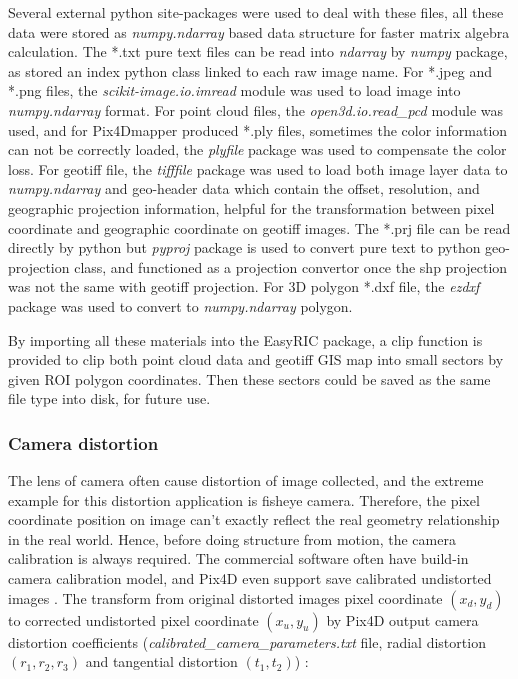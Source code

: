 \documentclass{configs/bmcart}
\begin{document}
Several external python site-packages were used to deal with these files, all these data were stored as \textit{numpy.ndarray} based data structure for faster matrix algebra calculation. The *.txt pure text files can be read into \textit{ndarray} by \textit{numpy} package, as stored an index python class linked to each raw image name. For *.jpeg and *.png files, the \textit{scikit-image.io.imread} module was used to load image into \textit{numpy.ndarray} format. For point cloud files, the \textit{open3d.io.read\_pcd} module was used, and for Pix4Dmapper produced *.ply files, sometimes the color information can not be correctly loaded, the \textit{plyfile} package was used to compensate the color loss. For geotiff file, the \textit{tifffile} package was used to load both image layer data to \textit{numpy.ndarray} and geo-header data which contain the offset, resolution, and geographic projection information, helpful for the transformation between pixel coordinate and geographic coordinate on geotiff images. The *.prj file can be read directly by python but \textit{pyproj} package is used to convert pure text to python geo-projection class, and functioned as a projection convertor once the shp projection was not the same with geotiff projection. For 3D polygon *.dxf file, the \textit{ezdxf} package was used to convert to \textit{numpy.ndarray} polygon.

By importing all these materials into the EasyRIC package, a clip function is provided to clip both point cloud data and geotiff GIS map into small sectors by given ROI polygon coordinates. Then these sectors could be saved as the same file type into disk, for future use.

\subsubsection*{Camera distortion}
The lens of camera often cause distortion of image collected, and the extreme example for this distortion application is fisheye camera. Therefore, the pixel coordinate position on image can't exactly reflect the real geometry relationship in the real world. Hence, before doing structure from motion, the camera calibration is always required. The commercial software often have build-in camera calibration model, and Pix4D even support save calibrated undistorted images \cite{pix4d_support_menu_2020}. The transform from original distorted images pixel coordinate $(x_d, y_d)$ to corrected undistorted pixel coordinate $(x_u, y_u)$ by Pix4D output camera distortion coefficients (\textit{calibrated\_camera\_parameters.txt} file, radial distortion $(r_1, r_2, r_3)$ and tangential distortion $(t_1, t_2)$) \cite{pix4d_support_how_2020}:
\end{document}

